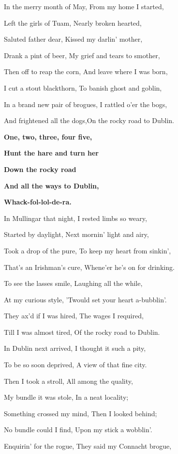In the merry month of May, From my home I started,

Left the girls of Tuam, Nearly broken hearted,

Saluted father dear, Kissed my darlin' mother,

Drank a pint of beer, My grief and tears to smother,

Then off to reap the corn, And leave where I was born,

I cut a stout blackthorn, To banish ghost and goblin,

In a brand new pair of brogues, I rattled o'er the bogs,

And frightened all the dogs,On the rocky road to Dublin.

\bigskip

\textbf{One, two, three, four five,}

\textbf{Hunt the hare and turn her}

\textbf{Down the rocky road}

\textbf{And all the ways to Dublin,}

\textbf{Whack-fol-lol-de-ra.}

\bigskip

In Mullingar that night, I rested limbs so weary,

Started by daylight, Next mornin' light and airy,

Took a drop of the pure, To keep my heart from sinkin',

That's an Irishman's cure, Whene'er he's on for drinking.

To see the lasses smile, Laughing all the while,

At my curious style, 'Twould set your heart a-bubblin'.

They ax'd if I was hired, The wages I required,

Till I was almost tired, Of the rocky road to Dublin.

\bigskip

In Dublin next arrived, I thought it such a pity,

To be so soon deprived, A view of that fine city.

Then I took a stroll, All among the quality,

My bundle it was stole, In a neat locality;

Something crossed my mind, Then I looked behind;

No bundle could I find, Upon my stick a wobblin'.

Enquirin' for the rogue, They said my Connacht brogue,

